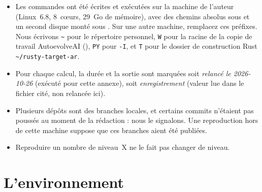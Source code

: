 \begin{warnbox}
\begin{itemize}
\item Les commandes ont été écrites et exécutées sur la machine de l'auteur (Linux~6.8, 8~cœurs, 29~Go de mémoire), avec
des chemins absolus sous  et un second disque monté sous
. Sur une autre machine, remplacez ces préfixes. Nous écrivons \texttt{\~{}}
pour le répertoire personnel, \texttt{W} pour la racine de la copie de travail AutoevolveAI
(), \texttt{PY} pour
 \texttt{-I}, et \texttt{T} pour le dossier de construction Rust
\texttt{\~{}/rusty-target-ar}.
\item Pour chaque calcul, la durée et la sortie sont marquées soit \emph{relancé le 2026-10-26} (exécuté pour cette
annexe), soit \emph{enregistrement} (valeur lue dans le fichier cité, non relancée ici).
\item Plusieurs dépôts sont des branches locales, et certains commits n'étaient pas poussés au moment de la
rédaction : nous le signalons. Une reproduction hors de cette machine suppose que ces branches aient été publiées.
\item Reproduire un nombre de niveau~X ne le fait pas changer de niveau.
\end{itemize}
\end{warnbox}

\section{L'environnement}\label{appE:sec:env}

